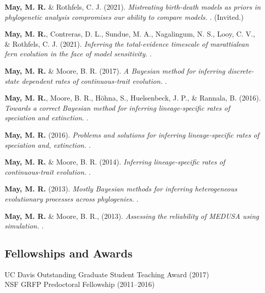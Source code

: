 \begin{etaremune}[topsep=0pt,itemsep=1.2em,partopsep=0pt,parsep=0pt]
    \item \textbf{May, M. R.} \& Rothfels, C. J. (2021). \textit{Mistreating birth-death models as priors in phylogenetic analysis compromises our ability to compare models.} . (Invited.)
    \item \textbf{May, M. R.}, Contreras, D. L., Sundue, M. A., Nagalingum, N. S., Looy, C. V., \& Rothfels, C. J. (2021). \textit{Inferring the total-evidence timescale of marattialean fern evolution in the face of model sensitivity.} .
    \item \textbf{May, M. R.} \& Moore, B. R. (2017). \textit{A Bayesian method for inferring discrete-state dependent rates of continuous-trait evolution.} .
    \item \textbf{May, M. R.}, Moore, B. R., Höhna, S., Huelsenbeck, J. P., \& Rannala, B. (2016). \textit{Towards a correct Bayesian method for inferring lineage-specific rates of speciation and extinction.} .
    \item \textbf{May, M. R.} (2016). \textit{Problems and solutions for inferring lineage-specific rates of speciation and, extinction.} .
    \item \textbf{May, M. R.} \& Moore, B. R. (2014). \textit{Inferring lineage-specific rates of continuous-trait evolution.} .
    \item \textbf{May, M. R.} (2013). \textit{Mostly Bayesian methods for inferring heterogeneous evolutionary processes across phylogenies.} .
    \item \textbf{May, M. R.} \& Moore, B. R., (2013). \textit{Assessing the reliability of MEDUSA using simulation.} .
\end{etaremune}



\subsection*{Fellowships and Awards}

\begin{adjustwidth}{1em}{}
UC Davis Outstanding Graduate Student Teaching Award (2017) \\
NSF GRFP Predoctoral Fellowship (2011--2016)
\end{adjustwidth}

